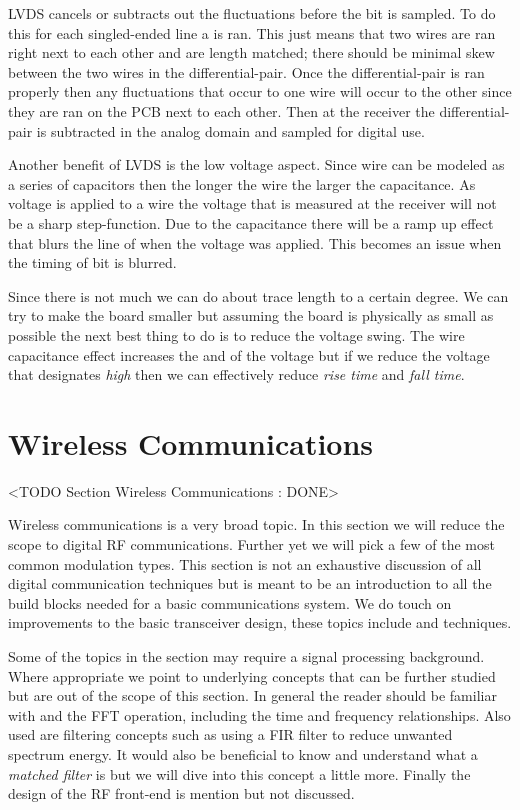 \ac{LVDS} cancels or subtracts out the fluctuations before the bit is sampled. To do this for each singled-ended line a  is ran. This just means that two wires are ran right next to each other and are length matched; there should be minimal skew between the two wires in the differential-pair. Once the differential-pair is ran properly then any fluctuations that occur to one wire will occur to the other since they are ran on the \ac{PCB} next to each other. Then at the receiver the differential-pair is subtracted in the analog domain and sampled for digital use.

Another benefit of \ac{LVDS} is the low voltage aspect. Since wire can be modeled as a series of capacitors then the longer the wire the larger the capacitance. As voltage is applied to a wire the voltage that is measured at the receiver will not be a sharp step-function. Due to the capacitance there will be a ramp up effect that blurs the line of when the voltage was applied. This becomes an issue when the timing of bit is blurred.

Since there is not much we can do about trace length to a certain degree. We can try to make the board smaller but assuming the board is physically as small as possible the next best thing to do is to reduce the voltage swing. The wire capacitance effect increases the \emph{} and \emph{} of the voltage but if we reduce the voltage that designates \emph{high} then we can effectively reduce \emph{rise time} and \emph{fall time}.	
	
	
\section{Wireless Communications}
	<TODO Section Wireless Communications : DONE>

Wireless communications is a very broad topic. In this section we will reduce the scope to digital \ac{RF} communications. Further yet we will pick a few of the most common modulation types. This section is not an exhaustive discussion of all digital communication techniques but is meant to be an introduction to all the build blocks needed for a basic communications system. We do touch on improvements to the basic transceiver design, these topics include  and  techniques.

Some of the topics in the section may require a signal processing background. Where appropriate we point to underlying concepts that can be further studied but are out of the scope of this section. In general the reader should be familiar with  and the \ac{FFT} operation, including the time and frequency relationships. Also used are filtering concepts such as using a \ac{FIR} filter to reduce unwanted spectrum energy. It would also be beneficial to know and understand what a \emph{matched filter} is but we will dive into this concept a little more. Finally the design of the \ac{RF} front-end is mention but not discussed.

